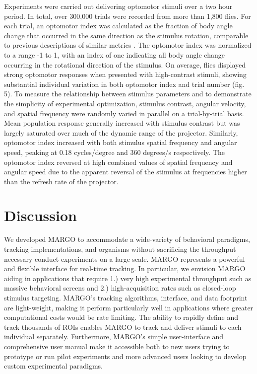\documentclass[10pt]{article}
\begin{document}
\begin{multicols}{2}
Experiments were carried out delivering optomotor stimuli over a two hour period. In total, over 300,000 trials were recorded from more than 1,800 flies. For each trial, an optomotor index was calculated as the fraction of body angle change that occurred in the same direction as the stimulus rotation, comparable to previous descriptions of similar metrics \cite{Seelig_Two_2010}. The optomotor index was normalized to a range -1 to 1, with an index of one indicating all body angle change occurring in the rotational direction of the stimulus. On average, flies displayed strong optomotor responses when presented with high-contrast stimuli, showing substantial individual variation in both optomotor index and trial number (fig. 5). To measure the relationship between stimulus parameters and to demonstrate the simplicity of experimental optimization, stimulus contrast, angular velocity, and spatial frequency were randomly varied in parallel on a trial-by-trial basis. Mean population response generally increased with stimulus contrast but was largely saturated over much of the dynamic range of the projector. Similarly, optomotor index increased with both stimulus spatial frequency and angular speed, peaking at 0.18 cycles/degree and 360 degrees/s respectively. The optomotor index reversed at high combined values of spatial frequency and angular speed due to the apparent reversal of the stimulus at frequencies higher than the refresh rate of the projector.


\section*{Discussion}

We developed MARGO to accommodate a wide-variety of behavioral paradigms, tracking implementations, and organisms without sacrificing the throughput necessary conduct experiments on a large scale. MARGO represents a powerful and flexible interface for real-time tracking. In particular, we envision MARGO aiding in applications that require 1.) very high experimental throughput such as massive behavioral screens and 2.) high-acquisition rates such as closed-loop stimulus targeting. MARGO's tracking algorithms, interface, and data footprint are light-weight, making it perform particularly well in applications where greater computational costs would be rate limiting. The ability to rapidly define and track thousands of ROIs enables MARGO to track and deliver stimuli to each individual separately. Furthermore, MARGO's simple user-interface and comprehensive user manual make it accessible both to new users trying to prototype or run pilot experiments and more advanced users looking to develop custom experimental paradigms.


\end{multicols}
\end{document}

